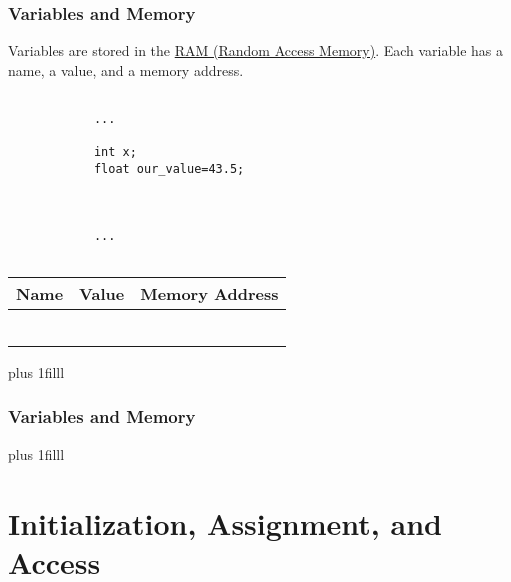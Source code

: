 \documentclass[fleqn]{beamer} %
\newcommand{\sectiontitleII}{Variables and Memory}
\newcommand{\sectiontitleIII}{Initialization, Assignment, and Access}
\newcommand{\btVFill}{\vskip0pt plus 1filll}
\begin{document}
	\begin{frame}[label=sectionII,containsverbatim] \small
		\frametitle{\sectiontitleII}
		
		Variables are stored in the \href{https://en.wikipedia.org/wiki/Random-access_memory}{RAM (Random Access Memory)}. Each variable has a {\BL name}, a {\GR value}, and a {\PR memory address}.  \vspace{5mm}\\
		
		\begin{multicols}{2}
			
			\begin{lstlisting}
			
			...
			
			int x;
			float our_value=43.5;
			
			
			
			...			
			
			\end{lstlisting}
			
			\renewcommand*{\arraystretch}{1.5}
			\begin{tabular}{c|c|c} 
				Name&Value&Memory Address\\ \hline
				& & \\ \hline
				& & \\ \hline
				& & \\ \hline
				& & \\ \hline
				& & \\ \hline
				& & \\ \hline
			\end{tabular}
			
				
			
		\end{multicols}
		
		\btVFill
		
		
	\end{frame}

	\begin{frame} \small
		\frametitle{\sectiontitleII}
		
		
		\btVFill
	\end{frame}	


\section{\sectiontitleIII}
\end{document}
